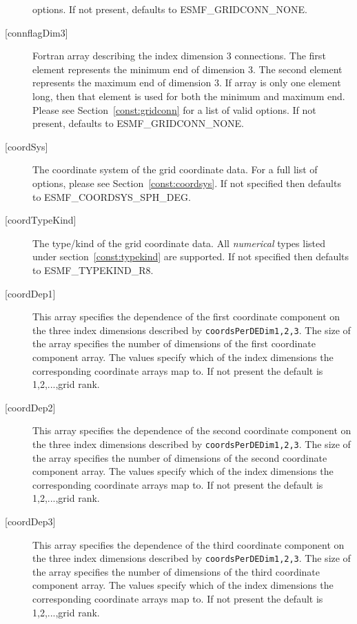 \begin{description}
        options. If not present, defaults to ESMF\_GRIDCONN\_NONE.
   \item[{[connflagDim3]}]
        Fortran array describing the index dimension 3 connections.
        The first element represents the minimum end of dimension 3.
        The second element represents the maximum end of dimension 3.
        If array is only one element long, then that element is used
        for both the minimum and maximum end.
        Please see Section~\ref{const:gridconn} for a list of valid
        options. If not present, defaults to ESMF\_GRIDCONN\_NONE.
   \item[{[coordSys]}]
       The coordinate system of the grid coordinate data.
       For a full list of options, please see Section~\ref{const:coordsys}.
       If not specified then defaults to ESMF\_COORDSYS\_SPH\_DEG.
   \item[{[coordTypeKind]}]
       The type/kind of the grid coordinate data. All {\em numerical} types
       listed under section~\ref{const:typekind} are supported.
       If not specified then defaults to ESMF\_TYPEKIND\_R8.
   \item[{[coordDep1]}]
       This array specifies the dependence of the first
       coordinate component on the three index dimensions
       described by {\tt coordsPerDEDim1,2,3}. The size of the
       array specifies the number of dimensions of the first
       coordinate component array. The values specify which
       of the index dimensions the corresponding coordinate
       arrays map to. If not present the default is 1,2,...,grid rank.
   \item[{[coordDep2]}]
       This array specifies the dependence of the second
       coordinate component on the three index dimensions
       described by {\tt coordsPerDEDim1,2,3}. The size of the
       array specifies the number of dimensions of the second
       coordinate component array. The values specify which
       of the index dimensions the corresponding coordinate
       arrays map to. If not present the default is 1,2,...,grid rank.
   \item[{[coordDep3]}]
       This array specifies the dependence of the third
       coordinate component on the three index dimensions
       described by {\tt coordsPerDEDim1,2,3}. The size of the
       array specifies the number of dimensions of the third
       coordinate component array. The values specify which
       of the index dimensions the corresponding coordinate
       arrays map to. If not present the default is 1,2,...,grid rank.

\end{description}
